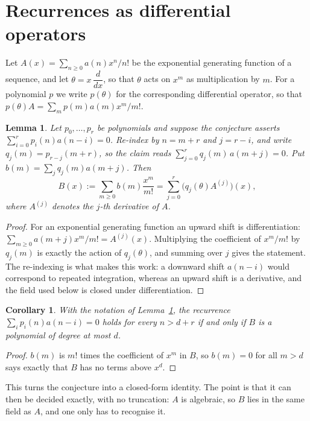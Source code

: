 \documentclass[11pt,a4paper]{article}
\theoremstyle{plain}
\newtheorem{lemma}[theorem]{Lemma}
\newtheorem{corollary}[theorem]{Corollary}
\theoremstyle{definition}
\begin{document}
\section{Recurrences as differential operators}

Let $A(x)=\sum_{n\ge0}a(n)x^{n}/n!$ be the exponential generating function of a sequence, and let
$\theta=x\,\dfrac{d}{dx}$, so that $\theta$ acts on $x^{m}$ as multiplication by $m$. For a
polynomial $p$ we write $p(\theta)$ for the corresponding differential operator, so that
$p(\theta)A=\sum_{m}p(m)a(m)x^{m}/m!$.

\begin{lemma}\label{lem:transfer}
Let $p_{0},\dots,p_{r}$ be polynomials and suppose the conjecture asserts
$\sum_{i=0}^{r}p_{i}(n)a(n-i)=0$. Re-index by $n=m+r$ and $j=r-i$, and write
$q_{j}(m)=p_{r-j}(m+r)$, so the claim reads $\sum_{j=0}^{r}q_{j}(m)\,a(m+j)=0$. Put
$b(m)=\sum_{j}q_{j}(m)a(m+j)$. Then
\[
B(x):=\sum_{m\ge0}b(m)\frac{x^{m}}{m!}=\sum_{j=0}^{r}\bigl(q_{j}(\theta)A^{(j)}\bigr)(x),
\]
where $A^{(j)}$ denotes the $j$-th derivative of $A$.
\end{lemma}

\begin{proof}
For an exponential generating function an upward shift is differentiation:
$\sum_{m\ge0}a(m+j)x^{m}/m!=A^{(j)}(x)$. Multiplying the coefficient of $x^{m}/m!$ by
$q_{j}(m)$ is exactly the action of $q_{j}(\theta)$, and summing over $j$ gives the
statement. The re-indexing is what makes this work: a downward shift $a(n-i)$ would
correspond to repeated integration, whereas an upward shift is a derivative, and the
field used below is closed under differentiation.
\end{proof}

\begin{corollary}\label{cor:criterion}
With the notation of Lemma~\ref{lem:transfer}, the recurrence
$\sum_{i}p_{i}(n)a(n-i)=0$ holds for every $n>d+r$ if and only if $B$ is a polynomial of
degree at most $d$.
\end{corollary}

\begin{proof}
$b(m)$ is $m!$ times the coefficient of $x^{m}$ in $B$, so $b(m)=0$ for all $m>d$ says
exactly that $B$ has no terms above $x^{d}$.
\end{proof}

This turns the conjecture into a closed-form identity. The point is that it can then be
decided exactly, with no truncation: $A$ is algebraic, so $B$ lies in the same field as
$A$, and one only has to recognise it.
\end{document}

